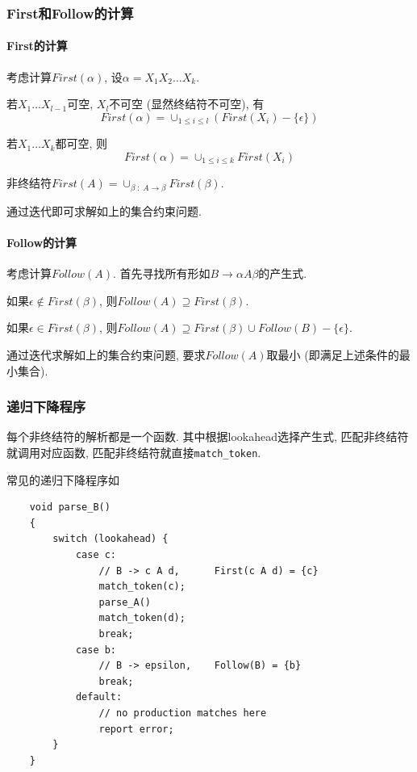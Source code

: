 \documentclass{ctexart}
\begin{document}
\subsubsection{First和Follow的计算}
\paragraph{First的计算} 考虑计算$First(\alpha)$, 设$\alpha = X_1 X_2 \ldots X_k$.\par
    若$X_1\ldots X_{l-1}$可空, $X_l$不可空 (显然终结符不可空), 有\[
        First(\alpha) = \cup_{1 \le i \le l} \left( First(X_i) - \{\epsilon\} \right) \]\par
    若$X_1 \ldots X_k$都可空, 则\[
        First(\alpha) = \cup_{1 \le i \le k} First(X_i)\]\par
    非终结符$First(A) = \cup_{\beta\;:\; A \to \beta} First(\beta)$.\par
    通过迭代即可求解如上的集合约束问题.
\paragraph{Follow的计算} 考虑计算$Follow(A)$. 首先寻找所有形如$B \to \alpha A \beta$的产生式.\par
    如果$\epsilon \not\in First(\beta)$, 则$Follow(A) \supseteq First(\beta)$.\par
    如果$\epsilon \in First(\beta)$, 则$Follow(A) \supseteq First(\beta) \cup Follow(B) - \{\epsilon\}$.\par
    通过迭代求解如上的集合约束问题, 要求$Follow(A)$取最小 (即满足上述条件的最小集合).
\subsubsection{递归下降程序} 每个非终结符的解析都是一个函数.
    其中根据lookahead选择产生式, 匹配非终结符就调用对应函数, 匹配非终结符就直接\texttt{match\_token}.\par
    常见的递归下降程序如\begin{verbatim}
    void parse_B()
    {
        switch (lookahead) {
            case c: 
                // B -> c A d,      First(c A d) = {c}
                match_token(c); 
                parse_A()
                match_token(d);
                break;
            case b: 
                // B -> epsilon,    Follow(B) = {b}
                break;
            default:
                // no production matches here
                report error;
        }
    }\end{verbatim}
\end{document}
